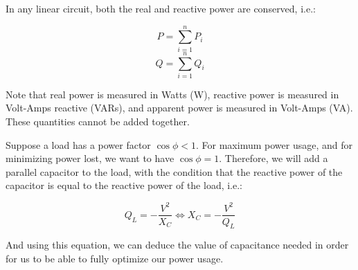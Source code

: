 \documentclass{article}
\begin{document}
\begin{proposition}
    In any linear circuit, both the real and reactive power are conserved, i.e.:

    \[ P = \sum_{i = 1}^n P_i \]
    \[ Q = \sum_{i = 1}^n Q_i \]
\end{proposition}

Note that real power is measured in Watts (W), reactive power is measured in Volt-Amps reactive (VARs), and apparent power is measured in Volt-Amps (VA). These quantities cannot be added together.

\begin{proposition}
    Suppose a load has a power factor $\cos{\phi} < 1$. For maximum power usage, and for minimizing power lost, we want to have $\cos{\phi} = 1$. Therefore, we will add a parallel capacitor to the load, with the condition that the reactive power of the capacitor is equal to the reactive power of the load, i.e.:

    \[ Q_L = -\frac{V^2}{X_C} \iff X_C = -\frac{V^2}{Q_L} \]

    And using this equation, we can deduce the value of capacitance needed in order for us to be able to fully optimize our power usage.
\end{proposition}
\end{document}
